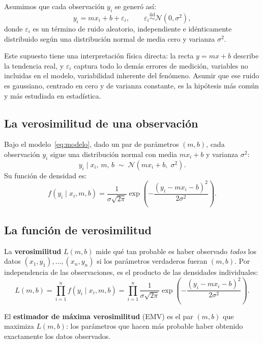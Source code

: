 \documentclass[12pt, a4paper]{article}
\begin{document}
Asumimos que cada observación $y_i$ se generó así:
\begin{equation}\label{eq:modelo}
    y_i = m x_i + b + \varepsilon_i,
    \qquad \varepsilon_i \overset{\text{iid}}{\sim} \mathcal{N}(0, \sigma^2),
\end{equation}
donde $\varepsilon_i$ es un término de ruido aleatorio, independiente
e idénticamente distribuido según una distribución normal de media cero
y varianza $\sigma^2$.

Este supuesto tiene una interpretación física directa: la recta $y = mx + b$
describe la tendencia real, y $\varepsilon_i$ captura todo lo demás\textemdash
errores de medición, variables no incluidas en el modelo, variabilidad
inherente del fenómeno. Asumir que ese ruido es gaussiano, centrado en
cero y de varianza constante, es la hipótesis más común y más estudiada
en estadística.

\subsection{La verosimilitud de una observación}

Bajo el modelo~\eqref{eq:modelo}, dado un par de parámetros $(m, b)$,
cada observación $y_i$ sigue una distribución normal con media $mx_i + b$
y varianza $\sigma^2$:
\[
    y_i \mid x_i,\, m,\, b \;\sim\; \mathcal{N}(mx_i + b,\; \sigma^2).
\]
Su función de densidad es:
\begin{equation}\label{eq:densidad}
    f(y_i \mid x_i, m, b) = \frac{1}{\sigma\sqrt{2\pi}}
    \exp\!\left(-\frac{(y_i - mx_i - b)^2}{2\sigma^2}\right).
\end{equation}

\subsection{La función de verosimilitud}

La \textbf{verosimilitud} $L(m, b)$ mide qué tan probable es haber
observado \emph{todos} los datos $(x_1, y_1), \ldots, (x_n, y_n)$
si los parámetros verdaderos fueran $(m, b)$. Por independencia de
las observaciones, es el producto de las densidades individuales:
\begin{equation}\label{eq:likelihood}
    L(m, b) = \prod_{i=1}^{n} f(y_i \mid x_i, m, b)
    = \prod_{i=1}^{n} \frac{1}{\sigma\sqrt{2\pi}}
      \exp\!\left(-\frac{(y_i - mx_i - b)^2}{2\sigma^2}\right).
\end{equation}

El \textbf{estimador de máxima verosimilitud} (EMV) es el par $(m, b)$
que maximiza $L(m, b)$: los parámetros que hacen más probable haber
obtenido exactamente los datos observados.
\end{document}
